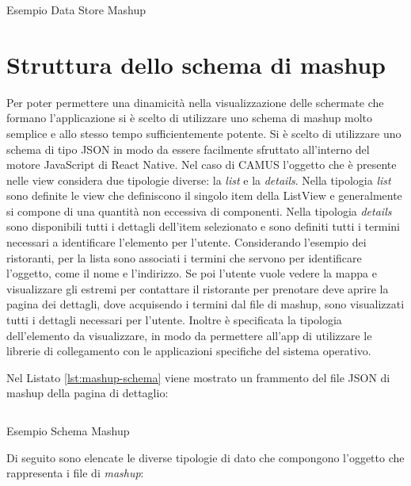 \begin{listing}[H]
	\inputminted{json}{6-implementazione-app/Codice/store-two-topics.json}
	\caption{Esempio Data Store Mashup}
	\label{lst:store-two-topics}
\end{listing}

\section{Struttura dello schema di mashup}

Per poter permettere una dinamicità nella visualizzazione delle schermate che formano l'applicazione si è scelto di utilizzare uno schema di mashup molto semplice e allo stesso tempo sufficientemente potente. Si è scelto di utilizzare uno schema di tipo JSON in modo da essere facilmente sfruttato all'interno del motore JavaScript di React Native. 
Nel caso di CAMUS l'oggetto che è presente nelle view considera due tipologie diverse: la \emph{list} e la \emph{details}. Nella tipologia \emph{list} sono definite le view che definiscono il singolo item della ListView e generalmente si compone di una quantità non eccessiva di componenti.
Nella tipologia \emph{details} sono disponibili tutti i dettagli dell'item selezionato e sono definiti tutti i termini necessari a identificare l'elemento per l'utente.
Considerando l'esempio dei ristoranti, per la lista sono associati i termini che servono per identificare l'oggetto, come il nome e l'indirizzo. Se poi l'utente vuole vedere la mappa e visualizzare gli estremi per contattare il ristorante per prenotare deve aprire la pagina dei dettagli, dove acquisendo i termini dal file di mashup, sono visualizzati tutti i dettagli necessari per l'utente. Inoltre è specificata la tipologia dell'elemento da visualizzare, in modo da permettere all'app di utilizzare le librerie di collegamento con le applicazioni specifiche del sistema operativo.

Nel Listato \ref{lst:mashup-schema} viene mostrato un frammento del file JSON di mashup della pagina di dettaglio:

\begin{listing}[H]
	\inputminted{json}{6-implementazione-app/Codice/mashup-schema-example-app.json}
	\caption{Esempio Schema Mashup}
	\label{lst:mashup-schema}
\end{listing}

Di seguito sono elencate le diverse tipologie di dato che compongono l'oggetto che rappresenta i file di \emph{mashup}:

